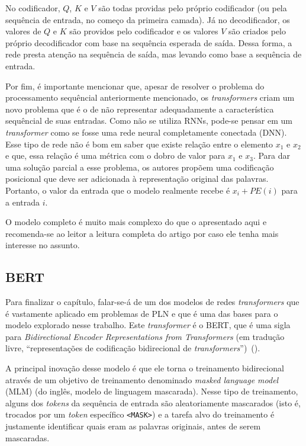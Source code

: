No codificador, $Q$, $K$ e $V$ são todas providas pelo próprio codificador (ou
pela sequência de entrada, no começo da primeira camada). Já no decodificador,
os valores de $Q$ e $K$ são providos pelo codificador e os valores $V$ são
criados pelo próprio decodificador com base na sequência esperada de saída.
Dessa forma, a rede presta atenção na sequência de saída, mas levando como base
a sequência de entrada.

Por fim, é importante mencionar que, apesar de resolver o problema do
processamento sequêncial anteriormente mencionado, os \textit{transformers}
criam um novo problema que é o de não representar adequadamente a característica
sequêncial de suas entradas. Como não se utiliza RNNs, pode-se pensar em um
\textit{transformer} como se fosse uma rede neural completamente conectada
(DNN). Esse tipo de rede não é bom em saber que existe relação entre o elemento
$x_1$ e $x_2$ e que, essa relação é uma métrica com o dobro de valor para $x_1$
e $x_3$. Para dar uma solução parcial a esse problema, os autores propõem uma
codificação posicional que deve ser adicionada à representação original das
palavras. Portanto, o valor da entrada que o modelo realmente recebe é
$x_i+PE(i)$ para a entrada $i$.

O modelo completo é muito mais complexo do que o apresentado aqui e recomenda-se
ao leitor a leitura completa do artigo por
\cite{vaswani-etal:2017:attention-is-all-you-need} caso ele tenha mais interesse
no assunto.

\subsection{BERT}%
\label{sub:bert}

Para finalizar o capítulo, falar-se-á de um dos modelos de redes
\textit{transformers} que é vastamente aplicado em problemas de PLN e que é uma
das bases para o modelo explorado nesse trabalho. Este \textit{transformer} é o
BERT, que é uma sigla para \textit{Bidirectional Encoder Representations from
Transformers} (em tradução livre, ``representações de codificação bidirecional
de \textit{transformers}'')~(\cite{devlin-etal:2018:bert}).

A principal inovação desse modelo é que ele torna o treinamento bidirecional
através de um objetivo de treinamento denominado \textit{masked language model}
(MLM) (do inglês, modelo de linguagem mascarada). Nesse tipo de treinamento,
alguns dos \textit{tokens} da sequência de entrada são aleatoriamente
mascarados (isto é, trocados por um \textit{token} específico \texttt{<MASK>}) e
a tarefa alvo do treinamento é justamente identificar quais eram as palavras
originais, antes de serem mascaradas.

